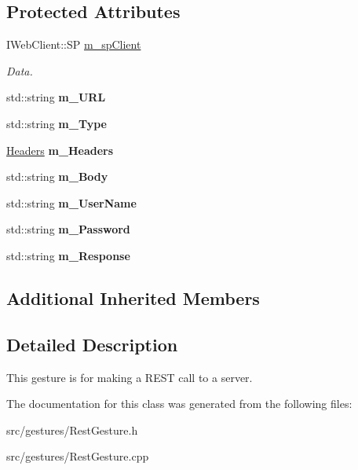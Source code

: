 \subsection*{Protected Attributes}
\begin{DoxyCompactItemize}
\item 
\mbox{\label{class_rest_gesture_a6a22d01d8dd0f079d11838cc9ff1fdef}} 
I\+Web\+Client\+::\+SP \hyperlink{class_rest_gesture_a6a22d01d8dd0f079d11838cc9ff1fdef}{m\+\_\+sp\+Client}
\begin{DoxyCompactList}\small\item\em Data. \end{DoxyCompactList}\item 
\mbox{\label{class_rest_gesture_a079d94256232fd5cefa7c0d3bc6dd29f}} 
std\+::string {\bfseries m\+\_\+\+U\+RL}
\item 
\mbox{\label{class_rest_gesture_aae1236601c757fe9ed87ebb807c67123}} 
std\+::string {\bfseries m\+\_\+\+Type}
\item 
\mbox{\label{class_rest_gesture_a64a1789c6e4cf7cc23af0fcf68e2bd90}} 
\hyperlink{class_rest_gesture_a4a175cc9d5bccdc4a21aed300daaf3a0}{Headers} {\bfseries m\+\_\+\+Headers}
\item 
\mbox{\label{class_rest_gesture_af3187b2c88a15426267a60ebe17adf94}} 
std\+::string {\bfseries m\+\_\+\+Body}
\item 
\mbox{\label{class_rest_gesture_a0b71a74bde90dcd240fcdd80320630b6}} 
std\+::string {\bfseries m\+\_\+\+User\+Name}
\item 
\mbox{\label{class_rest_gesture_a716d029740b448e5aa90a5f867d0c608}} 
std\+::string {\bfseries m\+\_\+\+Password}
\item 
\mbox{\label{class_rest_gesture_a93a5ee94d5e157536c9cdf3564816081}} 
std\+::string {\bfseries m\+\_\+\+Response}
\end{DoxyCompactItemize}
\subsection*{Additional Inherited Members}


\subsection{Detailed Description}
This gesture is for making a R\+E\+ST call to a server. 

The documentation for this class was generated from the following files\+:\begin{DoxyCompactItemize}
\item 
src/gestures/Rest\+Gesture.\+h\item 
src/gestures/Rest\+Gesture.\+cpp\end{DoxyCompactItemize}
